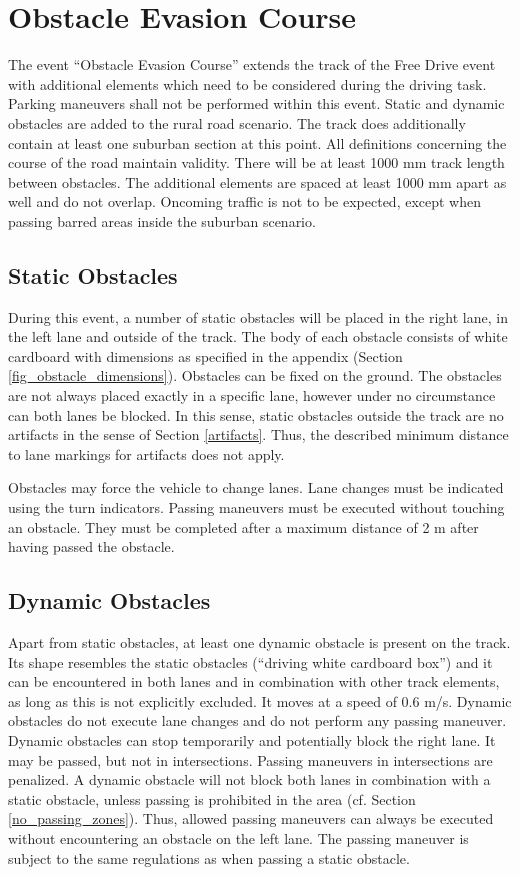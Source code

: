 \documentclass[a4paper]{report}
\begin{document}
\section{Obstacle Evasion Course}

The event “Obstacle Evasion Course” extends the track of the Free Drive event
with additional elements which need to be considered during the driving task.
Parking maneuvers shall not be performed within this event. Static and dynamic
obstacles are added to the rural road scenario. The track does additionally
contain at least one suburban section at this point. All definitions concerning
the course of the road maintain validity. There will be at least 1000 mm track
length between obstacles. The additional elements are spaced at least 1000 mm
apart as well and do not overlap. Oncoming traffic is not to be expected,
except when passing barred areas inside the suburban scenario.

\subsection{Static Obstacles}

During this event, a number of static obstacles will be placed in the right
lane, in the left lane and outside of the track. The body of each obstacle
consists of white cardboard with dimensions as specified in the appendix
(Section \ref{fig_obstacle_dimensions}). Obstacles can be fixed on the ground.
The obstacles are not always placed exactly in a specific lane, however under
no circumstance can both lanes be blocked. In this sense, static obstacles
outside the track are no artifacts in the sense of Section \ref{artifacts}.
Thus, the described minimum distance to lane markings for artifacts does not
apply.

Obstacles may force the vehicle to change lanes. Lane changes must be indicated
using the turn indicators. Passing maneuvers must be executed without touching
an obstacle. They must be completed after a maximum distance of 2 m after
having passed the obstacle.

\subsection{Dynamic Obstacles}

Apart from static obstacles, at least one dynamic obstacle is present on the
track. Its shape resembles the static obstacles (“driving white cardboard box”)
and it can be encountered in both lanes and in combination with other track
elements, as long as this is not explicitly excluded. It moves at a speed of
0.6 m/s. Dynamic obstacles do not execute lane changes and do not perform any
passing maneuver. Dynamic obstacles can stop temporarily and potentially block
the right lane. It may be passed, but not in intersections. Passing maneuvers
in intersections are penalized. A dynamic obstacle will not block both lanes in
combination with a static obstacle, unless passing is prohibited in the area
(cf. Section \ref{no_passing_zones}). Thus, allowed passing maneuvers can
always be executed without encountering an obstacle on the left lane. The
passing maneuver is subject to the same regulations as when passing a static
obstacle.
\end{document}
